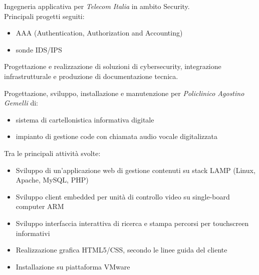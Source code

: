         {Ingegneria applicativa per \emph{Telecom Italia} in ambito Security. \\ Principali progetti seguiti:
          \begin{itemize}
          \item AAA (Authentication, Authorization and Accounting)
          \item sonde IDS/IPS
        \end{itemize}
          Progettazione e realizzazione di soluzioni di cybersecurity, integrazione infrastrutturale e produzione di documentazione tecnica.}
\vspace{3mm}
        {Progettazione, sviluppo, installazione e manutenzione per \emph{Policlinico Agostino Gemelli} di:
          \begin{itemize}
          \item  sistema di cartellonistica informativa digitale
          \item  impianto di gestione code con chiamata audio vocale digitalizzata
          \end{itemize}
          Tra le principali attività svolte:
          \begin{itemize}
          \item Sviluppo di un'applicazione web di gestione contenuti su stack LAMP (Linux, Apache, MySQL, PHP)
          \item Sviluppo client embedded per unità di controllo video su single-board computer ARM
          \item Sviluppo interfaccia interattiva di ricerca e stampa percorsi per touchscreen informativi
          \item Realizzazione grafica HTML5/CSS, secondo le linee guida del cliente
          \item Installazione su piattaforma VMware
          \end{itemize}}
\vspace{3mm}
